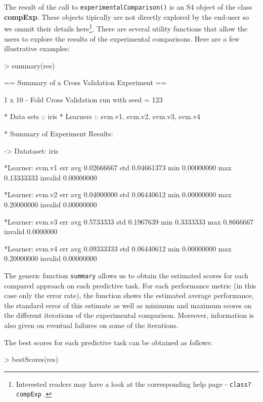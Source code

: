 \documentclass[10pt,a4paper]{article}
\begin{document}
The result of the call to \texttt{experimentalComparison()} is an S4
object of the class \textbf{compExp}. These objects tipically are not
 directly explored by the end-user so we ommit their
details here\footnote{Interested readers may have a look at the corresponding
  help page - \texttt{class?compExp} .}. There are several utility
functions that allow the users to explore the results of the
experimental comparisons. Here are a few illustrative examples:


\begin{Schunk}
\begin{Sinput}
> summary(res)
\end{Sinput}
\begin{Soutput}
== Summary of a  Cross Validation  Experiment ==

 1 x 10 - Fold Cross Validation run with seed =  123 

* Data sets ::  iris
* Learners  ::  svm.v1, svm.v2, svm.v3, svm.v4

* Summary of Experiment Results:


-> Datataset:  iris 

	*Learner: svm.v1 
               err
avg     0.02666667
std     0.04661373
min     0.00000000
max     0.13333333
invalid 0.00000000

	*Learner: svm.v2 
               err
avg     0.04000000
std     0.06440612
min     0.00000000
max     0.20000000
invalid 0.00000000

	*Learner: svm.v3 
              err
avg     0.5733333
std     0.1967639
min     0.3333333
max     0.8666667
invalid 0.0000000

	*Learner: svm.v4 
               err
avg     0.09333333
std     0.06440612
min     0.00000000
max     0.20000000
invalid 0.00000000
\end{Soutput}
\end{Schunk}

The generic function \texttt{summary} allows us to obtain the
estimated scores for each compared approach on each predictive
task. For each performance metric (in this case only the error rate),
the function shows the estimated average performance, the standard
error of this estimate as well as minimum and maximum scores on the
different iterations of the experimental comparison. Moreover,
information is also given on eventual failures on some of the
iterations.

The best scores for each predictive task can be obtained as follows:

\begin{Schunk}
\begin{Sinput}
> bestScores(res)
\end{Sinput}
\end{Schunk}
\end{document}
